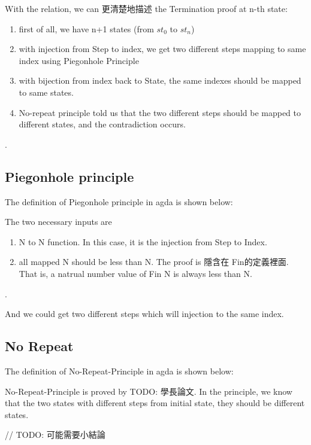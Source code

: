 With the relation, we can 更清楚地描述 the Termination proof at n-th state:
\begin{enumerate}[1.]
    \item first of all, we have n+1 states (from $st_{0}$ to $st_{n}$)
    \item with injection from Step to index, we get two different steps mapping to same index using Piegonhole Principle
    \item with bijection from index back to State, the same indexes should be mapped to same states.
    \item No-repeat principle told us that the two different steps should be mapped to different states, and the contradiction occurs.
\end{enumerate}.

\subsection{ Piegonhole principle }
The definition of Piegonhole principle in agda is shown below:



The two necessary inputs are 
\begin{enumerate}[1.]
    \item N to N function. In this case, it is the injection from Step to Index. 
    \item all mapped N should be less than N.  The proof is 隱含在 Fin的定義裡面.  That is, a natrual number value of Fin N is always less than N.
\end{enumerate}.

And we could get two different steps which will injection to the same index.

\subsection{ No Repeat }
The definition of No-Repeat-Principle in agda is shown below:

No-Repeat-Principle is proved by {TODO: 學長論文}.  In the principle, we know that the two states with different steps from initial state, they should be different states.


// TODO: 可能需要小結論

